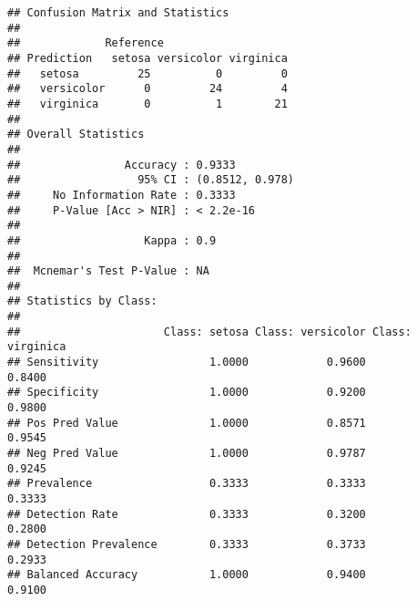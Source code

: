 \documentclass[
]{book}
\newenvironment{Shaded}{\begin{snugshade}}{\end{snugshade}}
\newcommand{\KeywordTok}[1]{\textcolor[rgb]{0.13,0.29,0.53}{\textbf{#1}}}
\newcommand{\NormalTok}[1]{#1}
\newcommand{\OperatorTok}[1]{\textcolor[rgb]{0.81,0.36,0.00}{\textbf{#1}}}
\newcommand{\StringTok}[1]{\textcolor[rgb]{0.31,0.60,0.02}{#1}}
\begin{document}
\begin{Shaded}
\end{Shaded}

\begin{verbatim}
## Confusion Matrix and Statistics
## 
##             Reference
## Prediction   setosa versicolor virginica
##   setosa         25          0         0
##   versicolor      0         24         4
##   virginica       0          1        21
## 
## Overall Statistics
##                                          
##                Accuracy : 0.9333         
##                  95% CI : (0.8512, 0.978)
##     No Information Rate : 0.3333         
##     P-Value [Acc > NIR] : < 2.2e-16      
##                                          
##                   Kappa : 0.9            
##                                          
##  Mcnemar's Test P-Value : NA             
## 
## Statistics by Class:
## 
##                      Class: setosa Class: versicolor Class: virginica
## Sensitivity                 1.0000            0.9600           0.8400
## Specificity                 1.0000            0.9200           0.9800
## Pos Pred Value              1.0000            0.8571           0.9545
## Neg Pred Value              1.0000            0.9787           0.9245
## Prevalence                  0.3333            0.3333           0.3333
## Detection Rate              0.3333            0.3200           0.2800
## Detection Prevalence        0.3333            0.3733           0.2933
## Balanced Accuracy           1.0000            0.9400           0.9100
\end{verbatim}

\begin{Shaded}
\end{Shaded}
\end{document}

